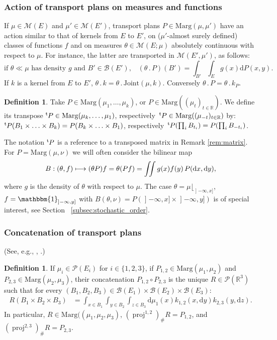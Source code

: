 \documentclass[10pt,a4paper]{article}
\providecommand{\resp}{respectively\ }
\newcommand{\ldot}{\mathbin{.}}
\newcommand\mto{\mathchoice{\longmapsto}{\mapsto}{\mapsto}{\mapsto}}
\theoremstyle{plain}
\theoremstyle{definition}
\newtheorem{defi}[them]{Definition}
\newcommand{\dd}{\mathrm{d}}
\newcommand{\join}{\mathrm{Joint}}
\newcommand{\one}{\mathbbm{1}}
\newcommand{\trans}{{}^{\mathrm{t}}\mkern-1mu}
\newcommand{\p}{\mathcal{P}}
\newcommand{\m}{\mathcal{M}}
\newcommand{\ma}{\mathrm{Marg}}
\newcommand{\R}{\mathbb{R}}
\newcommand{\pr}{\operatorname{proj}}
\newcommand{\op}{\mathopen}
\begin{document}
\subsubsection{Action of transport plans on measures and functions}\label{subsubsec:action_des_transports} If $\mu\in\m(E)$ and $\mu'\in\m(E')$, transport plans $P\in\ma(\mu,\mu')$ have an action similar to that of kernels from $E$ to $E'$, on ($\mu'$-almost surely defined) classes of functions $f$ and on measures $\theta\in\m(E;\mu)$ absolutely continuous with respect to $\mu$. For instance, the latter are transported in $\m(E',\mu')$, as follows:
\[\text{if $\theta\ll \mu$ has density $g$ and $B'\in{\mathcal B}(E')$,}\quad(\theta\ldot P)(B')=\int_{B'}\int_E g(x)\dd P(x,y).\]
If $k$ is a kernel from $E$ to $E'$, $\theta\ldot k=\theta\ldot \join(\mu,k)$. Conversely $\theta\ldot P=\theta\ldot k_P$.

\begin{defi}\label{defi:transpose} Take $P\in\ma(\mu_1,\ldots,\mu_k)$, or $P\in\ma((\mu_t)_{t\in\R})$. We define its transpose $\trans P\in\ma(\mu_k,\ldots,\mu_1)$, \resp $\trans P\in\ma((\mu_{-t})_{t\in\R})$ by: $ \trans P(B_1\times \ldots\times B_k)=P(B_k\times\ldots\times B_1)$, \resp $\trans P(\prod_iB_{t_i})=P(\prod_iB_{-t_i})$.
\end{defi}

The notation $\trans P$ is a reference to a transposed matrix in Remark \ref{rem:matrix}. For $P=\ma(\mu,\nu)$ we will often consider the bilinear map
\[B:(\theta,f)\mto (\theta P)f=\theta (Pf)=\iint g(x)f(y)\,P(\dd x,\dd y),\]
where $g$ is the density of $\theta$ with respect to $\mu$. The case $\theta=\mu\lfloor_{\op]-\infty,x]}$, $f=\one_{\op]-\infty,y]}$ with $B(\theta,\nu)=P(\op]-\infty,x]\times\op]-\infty,y])$ is of special interest, see Section~ \ref{subsec:stochastic_order}.

\subsubsection{Concatenation of transport plans}\label{subsec:caten} (See, e.g., \cite[p.\,111]{Ke72}, \cite[p.\,23]{Vi2}.)
\begin{defi}\label{defi:concatenation}
If $\mu_i\in\p(E_i)$ for $i\in\{1,2,3\}$, if $P_{1,2}\in\ma(\mu_1,\mu_2)$ and $P_{2,3}\in\ma(\mu_2,\mu_3)$, their concatenation $P_{1,2}\circ P_{2,3}$ is the unique $R\in\p(\R^3)$ such that for every $ (B_1,B_2,B_3)\in\mathcal{B}(E_1)\times\mathcal{B}(E_2)\times\mathcal{B}(E_3)$:
\begin{align}\label{eq:concatenation}
R(B_1\times B_2\times B_3)&=\int_{x\in B_1}\int_{y\in B_2}\int_{z\in B_3} \dd\mu_1(x)k_{1,2}(x,\dd y)k_{2,3}(y,\dd z).
\end{align}
In particular, $R\in\ma((\mu_1,\mu_2,\mu_3)$, $(\pr^{1,2})_\#R=P_{1,2}$, and $(\pr^{2,3})_\#R=P_{2,3}$.
\end{defi}
\end{document}
